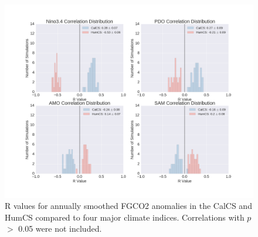 \documentclass[12pt]{article}
\begin{document}
\begin{figure}[!h]
	\centering
	\includegraphics[width=\linewidth]{../../figs/pacific/pacific-EBU-correlation-distributions-bothSmoothed.png}
	\caption{R values for annually smoothed FGCO2 anomalies in the CalCS and HumCS compared to four major climate indices. Correlations with $p$ $>$ 0.05 were not included.}
	\label{fig:pacific-histograms}
\end{figure}
\end{document}
